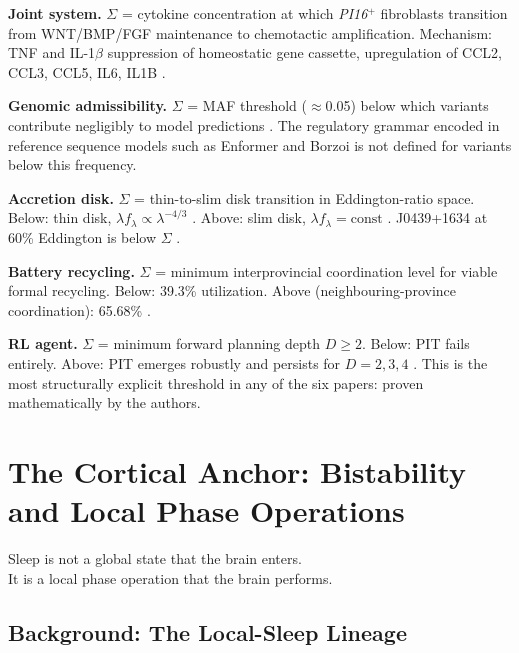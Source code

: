 \documentclass[12pt, a4paper, twoside]{book}
\theoremstyle{definition}
\theoremstyle{remark}
\newcommand{\gene}[1]{\textit{#1}}
\begin{document}
\textbf{Joint system.} $\Sigma$ = cytokine concentration at which \gene{PI16}$^+$ fibroblasts transition from WNT/BMP/FGF maintenance to chemotactic amplification. Mechanism: TNF and IL-1$\beta$ suppression of homeostatic gene cassette, upregulation of CCL2, CCL3, CCL5, IL6, IL1B \citep{davidson2026}.

\textbf{Genomic admissibility.} $\Sigma$ = MAF threshold ($\approx$0.05) below which variants contribute negligibly to model predictions \citep{spiro2026}. The regulatory grammar encoded in reference sequence models such as Enformer \citep{avsec2021} and Borzoi \citep{linder2025} is not defined for variants below this frequency.

\textbf{Accretion disk.} $\Sigma$ = thin-to-slim disk transition in Eddington-ratio space. Below: thin disk, $\lambda f_\lambda \propto \lambda^{-4/3}$ \citep{shakura1973}. Above: slim disk, $\lambda f_\lambda = \mathrm{const}$ \citep{abramowicz1988}. J0439+1634 at 60\% Eddington is below $\Sigma$ \citep{leung2026}.

\textbf{Battery recycling.} $\Sigma$ = minimum interprovincial coordination level for viable formal recycling. Below: 39.3\% utilization. Above (neighbouring-province coordination): 65.68\% \citep{tian2026}.

\textbf{RL agent.} $\Sigma$ = minimum forward planning depth $D \geq 2$. Below: PIT fails entirely. Above: PIT emerges robustly and persists for $D = 2, 3, 4$ \citep{okitsu2026}. This is the most structurally explicit threshold in any of the six papers: proven mathematically by the authors.

\chapter{The Cortical Anchor: Bistability and Local Phase Operations}
\label{ch:cortical}

\epigraph{Sleep is not a global state that the brain enters.\\
  It is a local phase operation that the brain performs.}{}

\section{Background: The Local-Sleep Lineage}
\end{document}
